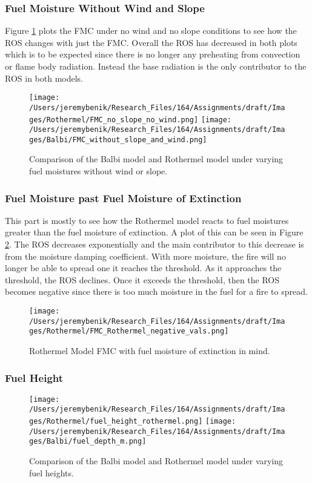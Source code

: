 \documentclass{article}
\begin{document}
\subsubsection*{Fuel Moisture Without Wind and Slope}
\indent Figure \ref{balbi_vs_rother_fmc_no_wind_no_slope} plots the FMC under no wind and no slope conditions to see how the ROS changes with just the FMC. Overall the ROS has decreased in both plots which is to be expected since there is no longer any preheating from convection or flame body radiation. Instead the base radiation is the only contributor to the ROS in both models. 
\begin{figure}[!h]
\centering
  \texttt{[image: /Users/jeremybenik/Research\_Files/164/Assignments/draft/Images/Rothermel/FMC\_no\_slope\_no\_wind.png]}
  \texttt{[image: /Users/jeremybenik/Research\_Files/164/Assignments/draft/Images/Balbi/FMC\_without\_slope\_and\_wind.png]}
  \caption{Comparison of the Balbi model and Rothermel model under varying fuel moistures without wind or slope.}
  \label{balbi_vs_rother_fmc_no_wind_no_slope}
\end{figure}
\subsubsection*{Fuel Moisture past Fuel Moisture of Extinction}
\indent This part is mostly to see how the Rothermel model reacts to fuel moistures greater than the fuel moisture of extinction. A plot of this can be seen in Figure \ref{rothermel_neg}. The ROS decreases exponentially and the main contributor to this decrease is from the moisture damping coefficient. With more moisture, the fire will no longer be able to spread one it reaches the threshold. As it approaches the threshold, the ROS declines. Once it exceeds the threshold, then the ROS becomes negative since there is too much moisture in the fuel for a fire to spread.


\begin{figure}[h]
\centering
  \texttt{[image: /Users/jeremybenik/Research\_Files/164/Assignments/draft/Images/Rothermel/FMC\_Rothermel\_negative\_vals.png]}
  \caption{Rothermel Model FMC with fuel moisture of extinction in mind.}
  \label{rothermel_neg}
\end{figure}



\subsubsection{Fuel Height}
\begin{figure}
\centering
  \texttt{[image: /Users/jeremybenik/Research\_Files/164/Assignments/draft/Images/Rothermel/fuel\_height\_rothermel.png]}
  \texttt{[image: /Users/jeremybenik/Research\_Files/164/Assignments/draft/Images/Balbi/fuel\_depth\_m.png]}
  \caption{Comparison of the Balbi model and Rothermel model under varying fuel heights.}
  \label{fuel height}
\end{figure}
\end{document}
